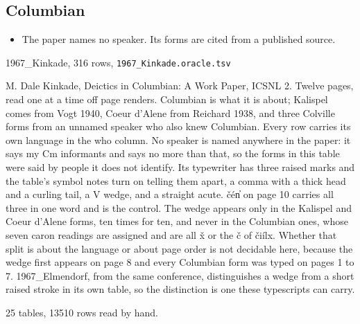 \subsection{Columbian}

\begin{itemize}
\item The paper names no speaker. Its forms are cited from a published source.
\end{itemize}

1967\_Kinkade, 316 rows, \texttt{1967\_\allowbreak{}Kinkade.\allowbreak{}oracle.\allowbreak{}tsv}

M. Dale Kinkade, Deictics in Columbian: A Work Paper, ICSNL 2. Twelve pages, read one at a time off page renders. Columbian is what it is about; Kalispel comes from Vogt 1940, Coeur d'Alene from Reichard 1938, and three Colville forms from an unnamed speaker who also knew Columbian. Every row carries its own language in the who column. No speaker is named anywhere in the paper: it says my Cm informants and says no more than that, so the forms in this table were said by people it does not identify. Its typewriter has three raised marks and the table's symbol notes turn on telling them apart, a comma with a thick head and a curling tail, a V wedge, and a straight acute. čén̓ on page 10 carries all three in one word and is the control. The wedge appears only in the Kalispel and Coeur d'Alene forms, ten times for ten, and never in the Columbian ones, whose seven caron readings are assigned and are all x̌ or the č of čiílx. Whether that split is about the language or about page order is not decidable here, because the wedge first appears on page 8 and every Columbian form was typed on pages 1 to 7. 1967\_Elmendorf, from the same conference, distinguishes a wedge from a short raised stroke in its own table, so the distinction is one these typescripts can carry.

\medskip

25 tables, 13510 rows read by hand.


